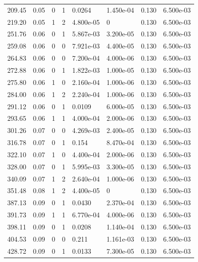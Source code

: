 \documentclass[preview]{standalone}
\begin{document}
{{\begin{tabular}{L{1.2cm}C{1.2cm} C{0.3cm}C{0.5cm} C{1.4cm}C{1.4cm} C{1.4cm}C{1.4cm}}
  209.45  &  0.05  & 0     &  1 &  0.0264  & 1.450e-04  & 0.130 &  6.500e-03   \\ 
  219.20  &  0.05  & 1     &  2 &  4.800e-05  & 0  & 0.130 &  6.500e-03   \\ 
  251.76  &  0.06  & 0     &  1 &  5.867e-03  & 3.200e-05  & 0.130 &  6.500e-03   \\ 
  259.08  &  0.06  & 0     &  0 &  7.921e-03  & 4.400e-05  & 0.130 &  6.500e-03   \\ 
  264.83  &  0.06  & 0     &  0 &  7.200e-04  & 4.000e-06  & 0.130 &  6.500e-03   \\ 
  272.88  &  0.06  & 0     &  1 &  1.822e-03  & 1.000e-05  & 0.130 &  6.500e-03   \\ 
  275.80  &  0.06  & 1     &  0 &  2.160e-04  & 1.000e-06  & 0.130 &  6.500e-03   \\ 
  284.00  &  0.06  & 1     &  2 &  2.240e-04  & 1.000e-06  & 0.130 &  6.500e-03   \\ 
  291.12  &  0.06  & 0     &  1 &  0.0109  & 6.000e-05  & 0.130 &  6.500e-03   \\ 
  293.65  &  0.06  & 1     &  1 &  4.000e-04  & 2.000e-06  & 0.130 &  6.500e-03   \\ 
  301.26  &  0.07  & 0     &  0 &  4.269e-03  & 2.400e-05  & 0.130 &  6.500e-03   \\ 
  316.78  &  0.07  & 0     &  1 &  0.154  & 8.470e-04  & 0.130 &  6.500e-03   \\ 
  322.10  &  0.07  & 1     &  0 &  4.400e-04  & 2.000e-06  & 0.130 &  6.500e-03   \\ 
  328.00  &  0.07  & 0     &  1 &  5.995e-03  & 3.300e-05  & 0.130 &  6.500e-03   \\ 
  340.09  &  0.07  & 1     &  2 &  2.640e-04  & 1.000e-06  & 0.130 &  6.500e-03   \\ 
  351.48  &  0.08  & 1     &  2 &  4.400e-05  & 0  & 0.130 &  6.500e-03   \\ 
  387.13  &  0.09  & 0     &  1 &  0.0430  & 2.370e-04  & 0.130 &  6.500e-03   \\ 
  391.73  &  0.09  & 1     &  1 &  6.770e-04  & 4.000e-06  & 0.130 &  6.500e-03   \\ 
  398.11  &  0.09  & 0     &  1 &  0.0208  & 1.140e-04  & 0.130 &  6.500e-03   \\ 
  404.53  &  0.09  & 0     &  0 &  0.211  & 1.161e-03  & 0.130 &  6.500e-03   \\ 
  428.72  &  0.09  & 0     &  1 &  0.0133  & 7.300e-05  & 0.130 &  6.500e-03   \\ 

\end{tabular}}}
\end{document}
